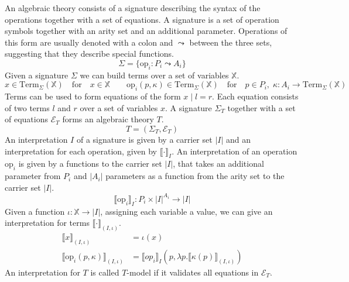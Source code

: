 An algebraic theory consists of a signature describing the syntax of the
operations together with a set of equations.
A signature is a set of operation symbols together with an arity set and an
additional parameter.
Operations of this form are usually denoted with a colon and $\leadsto$
between the three sets, suggesting that they describe special functions.
\[
  \Sigma = \{ \mathrm{op}_i : P_i \leadsto A_i  \}
\]
Given a signature $\Sigma$ we can build terms over a set of variables $\mathbb{X}$.
\[
  x \in \mathrm{Term}_\Sigma(\mathbb{X}) \quad\text{for}\quad x\in\mathbb{X} \qquad
  \mathrm{op}_i(p, \kappa) \in \mathrm{Term}_\Sigma(\mathbb{X}) \quad\text{for}\quad
  p\in P_i,\;\kappa : A_i \rightarrow \mathrm{Term}_\Sigma(\mathbb{X})
\]
Terms can be used to form equations of the form $x\;|\;l=r$.
Each equation consists of two terms $l$ and $r$ over a set of variables $x$.
A signature $\Sigma_T$ together with a set of equations $\mathcal{E}_T$ forms an
algebraic theory $T$.
\[
  T = (\Sigma_T, \mathcal{E}_T)
\]
An interpretation $I$ of a signature is given by a carrier set $|I|$ and an
interpretation for each operation, given by $\lBrack\cdot\rBrack_I$.
An interpretation of an operation $\mathrm{op}_i$ is given by a functions to the
carrier set $|I|$, that takes an additional parameter from $P_i$ and $|A_i|$
parameters as a function from the arity set to the carrier set $|I|$.
\[
  \lBrack \mathrm{op}_i \rBrack_I : P_i \times |I|^{A_i} \rightarrow |I|
\]
Given a function $\iota : \mathbb{X} \rightarrow |I|$, assigning each variable
a value, we can give an interpretation for terms $\lBrack\cdot\rBrack_{(I,\iota)}$.
\begin{align*} \lBrack x \rBrack_{(I,\iota)} &= \iota(x) \\
  \lBrack \mathrm{op}_i(p, \kappa)\rBrack_{(I,\iota)} &= \lBrack op_i \rBrack_I (p, \lambda p. \lBrack\kappa(p)\rBrack_{(I, \iota)})
\end{align*}
An interpretation for $T$ is called $T$-model if it validates all equations in $\mathcal{E}_T$.

% 

